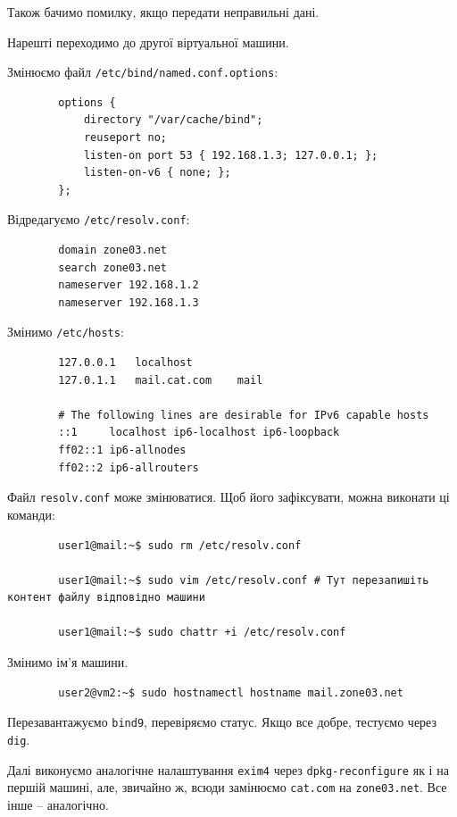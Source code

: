 \documentclass[14pt, a4paper]{extreport}
\begin{document}
	
	Також бачимо помилку, якщо передати неправильні дані.
	
	
	Нарешті переходимо до другої віртуальної машини.
	
	Змінюємо файл \texttt{/etc/bind/named.conf.options}:
	
	\begin{verbatim}
		options {
			directory "/var/cache/bind";
			reuseport no;
			listen-on port 53 { 192.168.1.3; 127.0.0.1; };
			listen-on-v6 { none; };
		};
	\end{verbatim}
	
	Відредагуємо \texttt{/etc/resolv.conf}:
	
	\begin{verbatim}
		domain zone03.net
		search zone03.net
		nameserver 192.168.1.2
		nameserver 192.168.1.3
	\end{verbatim}
	
	Змінимо \texttt{/etc/hosts}:
	
	\begin{verbatim}
		127.0.0.1	localhost
		127.0.1.1	mail.cat.com	mail
		
		# The following lines are desirable for IPv6 capable hosts
		::1     localhost ip6-localhost ip6-loopback
		ff02::1 ip6-allnodes
		ff02::2 ip6-allrouters
	\end{verbatim}
	
	Файл \texttt{resolv.conf} може змінюватися. Щоб його зафіксувати, можна виконати ці команди:
	
	\begin{verbatim}
		user1@mail:~$ sudo rm /etc/resolv.conf 
		
		user1@mail:~$ sudo vim /etc/resolv.conf # Тут перезапишіть контент файлу відповідно машини
		
		user1@mail:~$ sudo chattr +i /etc/resolv.conf
	\end{verbatim}
	
	Змінимо ім'я машини. 
	
	\begin{verbatim}
		user2@vm2:~$ sudo hostnamectl hostname mail.zone03.net
	\end{verbatim}
	
	Перезавантажуємо \texttt{bind9}, перевіряємо статус. Якщо все добре, тестуємо через \texttt{dig}.
	
	
	Далі виконуємо аналогічне налаштування \texttt{exim4} через \texttt{dpkg-reconfigure} як і на першій машині, але, звичайно ж, всюди замінюємо \texttt{cat.com} на \texttt{zone03.net}. Все інше -- аналогічно.
	
\end{document}
